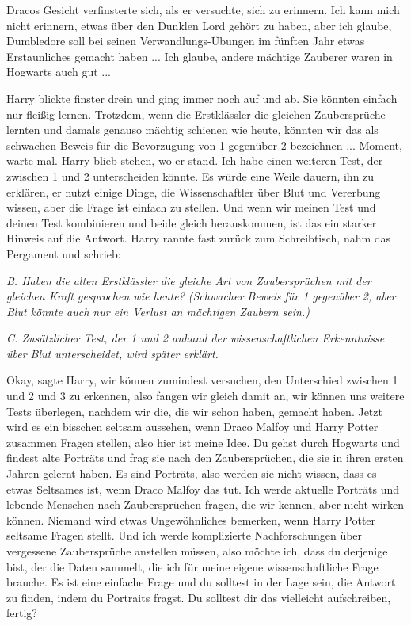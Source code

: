 Dracos Gesicht verfinsterte sich, als er versuchte, sich zu erinnern. \glqq{}Ich
kann mich nicht erinnern, etwas über den Dunklen Lord gehört zu haben, aber ich
glaube, Dumbledore soll bei seinen Verwandlungs-Übungen im fünften Jahr etwas
Erstaunliches gemacht haben ... Ich glaube, andere mächtige Zauberer waren in
Hogwarts auch gut ...\grqq{}

Harry blickte finster drein und ging immer noch auf und ab. \glqq{}Sie könnten
einfach nur fleißig lernen. Trotzdem, wenn die Erstklässler die gleichen
Zaubersprüche lernten und damals genauso mächtig schienen wie heute, könnten wir
das als schwachen Beweis für die Bevorzugung von 1 gegenüber 2 bezeichnen ...
Moment, warte mal.\grqq{} Harry blieb stehen, wo er stand. \glqq{}Ich habe einen
weiteren Test, der zwischen 1 und 2 unterscheiden könnte. Es würde eine Weile
dauern, ihn zu erklären, er nutzt einige Dinge, die Wissenschaftler über Blut
und Vererbung wissen, aber die Frage ist einfach zu stellen. Und wenn wir meinen
Test und deinen Test kombinieren und beide gleich herauskommen, ist das ein
starker Hinweis auf die Antwort.\grqq{} Harry rannte fast zurück zum
Schreibtisch, nahm das Pergament und schrieb:

\emph{B. Haben die alten Erstklässler die gleiche Art von Zaubersprüchen mit der
gleichen Kraft gesprochen wie heute? (Schwacher Beweis für 1 gegenüber 2, aber
Blut könnte auch nur ein Verlust an mächtigen Zaubern sein.)}

\emph{C. Zusätzlicher Test, der 1 und 2 anhand der wissenschaftlichen
Erkenntnisse über Blut unterscheidet, wird später erklärt.}

\glqq{}Okay\grqq{}, sagte Harry, \glqq{}wir können zumindest versuchen, den
Unterschied zwischen 1 und 2 und 3 zu erkennen, also fangen wir gleich damit an,
wir können uns weitere Tests überlegen, nachdem wir die, die wir schon haben,
gemacht haben. Jetzt wird es ein bisschen seltsam aussehen, wenn Draco Malfoy
und Harry Potter zusammen Fragen stellen, also hier ist meine Idee. Du gehst
durch Hogwarts und findest alte Porträts und frag sie nach den Zaubersprüchen,
die sie in ihren ersten Jahren gelernt haben. Es sind Porträts, also werden sie
nicht wissen, dass es etwas Seltsames ist, wenn Draco Malfoy das tut. Ich werde
aktuelle Porträts und lebende Menschen nach Zaubersprüchen fragen, die wir
kennen, aber nicht wirken können. Niemand wird etwas Ungewöhnliches bemerken,
wenn Harry Potter seltsame Fragen stellt. Und ich werde komplizierte
Nachforschungen über vergessene Zaubersprüche anstellen müssen, also möchte ich,
dass du derjenige bist, der die Daten sammelt, die ich für meine eigene
wissenschaftliche Frage brauche. Es ist eine einfache Frage und du solltest in
der Lage sein, die Antwort zu finden, indem du Portraits fragst. Du solltest dir
das vielleicht aufschreiben, fertig?\grqq{}

